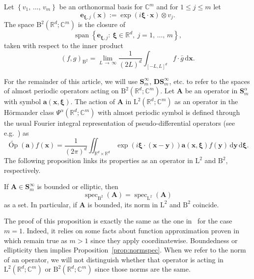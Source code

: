 \documentclass[10pt]{amsart}
\theoremstyle{definition}\newtheorem{defi}[theo]{Definition}\newtheorem{rema}[theo]{Remark}\newtheorem{exam}[theo]{Example}\newtheorem{nota}[theo]{Notation}
\DeclareMathOperator{\spann}{span}
\DeclareMathOperator{\spec}{spec}
\newcommand{\de}{\, \mathrm{d}}
\newcommand{\RB}{\mathrm{B}}
\newcommand{\RL}{\mathrm{L}}
\newcommand{\R}{\mathbb R}
\newcommand{\C}{\mathbb C}
\newcommand{\bxi}{\boldsymbol \xi}
\newcommand{\ba}{\mathbf a}
\newcommand{\BA}{\mathbf A}
\newcommand{\BD}{\mathbf D}
\newcommand{\BS}{\mathbf S}
\newcommand{\bx}{\mathbf x}
\newcommand{\be}{\mathbf e}
\newcommand{\by}{\mathbf y}
\newcommand{\set}[1]{\left\{ #1 \right\}}
\begin{document}
Let $\set{v_1,\,\dotsc,\,v_m}$ be an orthonormal basis for $\C^m$ and for $1 \le j
\le m$ let
\begin{equation}
\be_{\bxi,j}(\bx):= \exp(i \bxi \cdot \bx) \otimes v_j.
\end{equation}
The space $\RB^2(\R^d;\C^m)$ is the closure of
\begin{equation}
\spann \set{\be_{\bxi,j}:\ \bxi\in\R^d,\ j=1,\,\dots,\,m},
\end{equation}
taken with respect to the inner product
\begin{equation}
(f,g)_{\RB^2} = \lim_{L\,\to\,\infty} \frac{1}{(2L)^d}\int_{[-L,L]^d} f \cdot \bar g \de \bx.
\end{equation}

For the remainder of this article, we will use $\BS_m^\infty$, $\BD\BS_m^\infty$, etc. to refer to the spaces of almost periodic operators acting on $\RB^2(\R^d;\C^m)$. Let $\BA$ be an operator in $\BS_m^\alpha$ with symbol $\ba(\bx,\bxi)$. The action of $\BA$ in $\RL^2(\R^d;\C^m)$ as an operator in the H\"ormander class $\Psi^\alpha(\R^d;\C^m)$ with almost periodic symbol is defined through the usual Fourier integral representation of pseudo-differential operators (see e.g.~\cite{HormanderIII}) as
\[
\widetilde {\operatorname{Op}}(\ba)f(\bx) = \frac{1}{(2\pi)^d}\iint_{\R^d \times \R^d} \exp(i \bxi \cdot(\bx-\by))
\ba(\bx,\bxi) f(\by) \de \by \de \bxi.
\]
The following proposition links its properties as an operator in $\RL^2$ and $\RB^2$, respectively.

\begin{prop}\label{prop:normspec}
If $\BA \in \BS_m^\infty$ is bounded or elliptic, then
\begin{equation}
\spec_{\RB^2}(\BA) = \spec_{\RL^2}(\BA)
\end{equation}
as a set. In particular, if $\BA$ is bounded, its norm in $\RL^2$ and $\RB^2$ coincide.
\end{prop}

The proof of this proposition is exactly the same as the one in~\cite{Shubin1978} for the case $m = 1$. Indeed, it relies on some facts about function approximation proven in~\cite[Lemmata~4.1 and 4.2]{Shubin1978} which remain true as $m > 1$ since they apply coordinatewise. Boundedness or ellipticity then implies Proposition~\ref{prop:normspec}. When we refer to the norm of an operator, we will not distinguish whether that operator is acting in $\RL^2(\R^d;\C^m)$ or $\RB^2(\R^d;\C^m)$ since those norms are the same.
\end{document}
